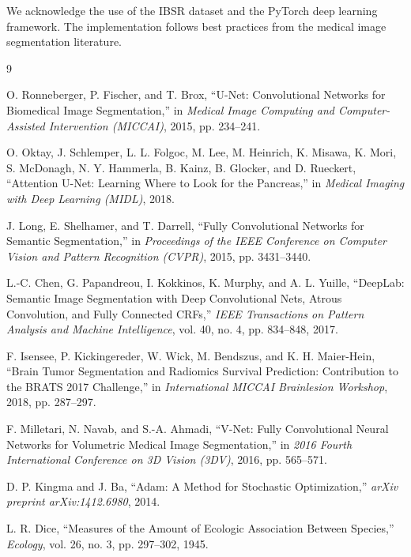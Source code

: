 \documentclass[12pt,a4paper]{article}
\begin{document}
We acknowledge the use of the IBSR dataset and the PyTorch deep learning framework. The implementation follows best practices from the medical image segmentation literature.


\begin{thebibliography}{9}

O. Ronneberger, P. Fischer, and T. Brox, ``U-Net: Convolutional Networks for Biomedical Image Segmentation,'' in \textit{Medical Image Computing and Computer-Assisted Intervention (MICCAI)}, 2015, pp. 234--241.

O. Oktay, J. Schlemper, L. L. Folgoc, M. Lee, M. Heinrich, K. Misawa, K. Mori, S. McDonagh, N. Y. Hammerla, B. Kainz, B. Glocker, and D. Rueckert, ``Attention U-Net: Learning Where to Look for the Pancreas,'' in \textit{Medical Imaging with Deep Learning (MIDL)}, 2018.

J. Long, E. Shelhamer, and T. Darrell, ``Fully Convolutional Networks for Semantic Segmentation,'' in \textit{Proceedings of the IEEE Conference on Computer Vision and Pattern Recognition (CVPR)}, 2015, pp. 3431--3440.

L.-C. Chen, G. Papandreou, I. Kokkinos, K. Murphy, and A. L. Yuille, ``DeepLab: Semantic Image Segmentation with Deep Convolutional Nets, Atrous Convolution, and Fully Connected CRFs,'' \textit{IEEE Transactions on Pattern Analysis and Machine Intelligence}, vol. 40, no. 4, pp. 834--848, 2017.

F. Isensee, P. Kickingereder, W. Wick, M. Bendszus, and K. H. Maier-Hein, ``Brain Tumor Segmentation and Radiomics Survival Prediction: Contribution to the BRATS 2017 Challenge,'' in \textit{International MICCAI Brainlesion Workshop}, 2018, pp. 287--297.

F. Milletari, N. Navab, and S.-A. Ahmadi, ``V-Net: Fully Convolutional Neural Networks for Volumetric Medical Image Segmentation,'' in \textit{2016 Fourth International Conference on 3D Vision (3DV)}, 2016, pp. 565--571.

D. P. Kingma and J. Ba, ``Adam: A Method for Stochastic Optimization,'' \textit{arXiv preprint arXiv:1412.6980}, 2014.

L. R. Dice, ``Measures of the Amount of Ecologic Association Between Species,'' \textit{Ecology}, vol. 26, no. 3, pp. 297--302, 1945.


\end{thebibliography}
\end{document}
